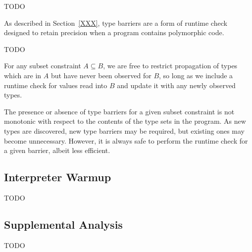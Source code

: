 TODO

As described in Section~\ref{XXX}, type barriers are a form of runtime
check designed to retain precision when a program contains polymorphic code.

TODO

For any subset constraint $A \subseteq B$, we are free to restrict
propagation of types which are in $A$ but have never been observed for $B$,
so long as we include a runtime check for values read into $B$ and update
it with any newly observed types.

The presence or absence of type barriers for a given subset constraint
is not monotonic with respect to the contents of the type sets in the program.
As new types are discovered, new type barriers may be required, but existing
ones may become unnecessary.
However, it is always safe to perform the runtime check for a given barrier,
albeit less efficient.

\subsection{Interpreter Warmup}

TODO

\subsection{Supplemental Analysis}

TODO
